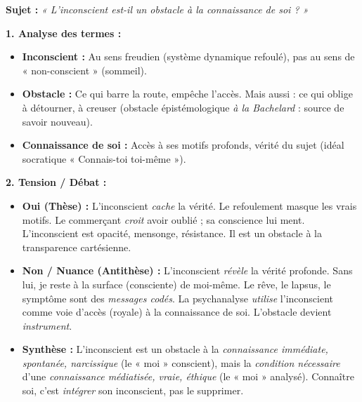 \documentclass[11pt]{article}
\begin{document}
\begin{exoresolu}
\textbf{Sujet :} \emph{« L'inconscient est-il un obstacle à la connaissance de soi ? »}

\textbf{1. Analyse des termes :}
\begin{itemize}
    \item \textbf{Inconscient :} Au sens freudien (système dynamique refoulé), pas au sens de « non-conscient » (sommeil).
    \item \textbf{Obstacle :} Ce qui barre la route, empêche l'accès. Mais aussi : ce qui oblige à détourner, à creuser (obstacle épistémologique \emph{à la Bachelard} : source de savoir nouveau).
    \item \textbf{Connaissance de soi :} Accès à ses motifs profonds, vérité du sujet (idéal socratique « Connais-toi toi-même »).
\end{itemize}

\textbf{2. Tension / Débat :}
\begin{itemize}
    \item \textbf{Oui (Thèse) :} L'inconscient \emph{cache} la vérité. Le refoulement masque les vrais motifs. Le commerçant \emph{croit} avoir oublié ; sa conscience lui ment. L'inconscient est opacité, mensonge, résistance. Il est un obstacle à la transparence cartésienne.
    \item \textbf{Non / Nuance (Antithèse) :} L'inconscient \emph{révèle} la vérité profonde. Sans lui, je reste à la surface (consciente) de moi-même. Le rêve, le lapsus, le symptôme sont des \emph{messages codés}. La psychanalyse \emph{utilise} l'inconscient comme voie d'accès (royale) à la connaissance de soi. L'obstacle devient \emph{instrument}.
    \item \textbf{Synthèse :} L'inconscient est un obstacle à la \emph{connaissance immédiate, spontanée, narcissique} (le « moi » conscient), mais la \emph{condition nécessaire} d'une \emph{connaissance médiatisée, vraie, éthique} (le « moi » analysé). Connaître soi, c'est \emph{intégrer} son inconscient, pas le supprimer.
\end{itemize}


\end{exoresolu}
\end{document}
